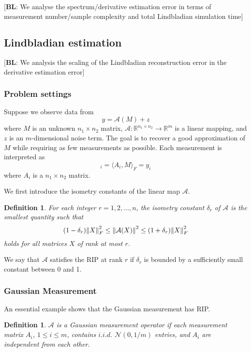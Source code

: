 \documentclass[10pt]{article}  %
\theoremstyle{plain}
\newtheorem{definition}[thm]{Definition}
\numberwithin{equation}{section}
\newcommand{\innerp}[1]{\langle{#1}\rangle}
\def\mN{\mathcal{N}}
\def\mA{\mathcal{A}}
\def\R{\mathbb{R}}
\newcommand{\bl}[1]{{\color{magenta} [\textbf{BL}: #1]}}
\renewcommand{\R}{\mathbb{R}}
\begin{document}
\bl{We analyse the spectrum/derivative estimation error in terms of measurement number/sample complexity and total Lindbladian simulation time}

\subsection{Lindbladian estimation}

\bl{We analysis the scaling of the Lindbladian reconstruction error in the derivative estimation error}

\subsubsection{Problem settings}
Suppose we observe data from 
\begin{equation}
	y = \mA(M) + z
\end{equation}
where $M$ is an unknown $n_1 \times n_2$ matrix, $\mA : \R^{n_1\times n_2} \to \R^m$ is a linear mapping, and $z$ is an $m$-dimensional noise term. The goal is to recover a good approximation of $M$ while requiring as few measurements as possible. Each measurement is interpreted as 
\begin{equation}
	[\mA(M)]_i = \innerp{A_i, M}_F = y_i
\end{equation}
where $A_i$ is a $n_1\times n_2$ matrix.





We first introduce the isometry constants of the linear map $\mA$. 
\begin{definition}
	For each integer $r = 1, 2, \dots , n$, the isometry constant $\delta_r$ of $\mA$ is the smallest quantity such that 
	\begin{equation}
		(1 - \delta_r)\norm{X}_F^2 \leq \norm{\mA(X)}^2 \leq (1 + \delta_r) \norm{X}_F^2
	\end{equation}
	holds for all matrices $X$ of rank at most $r$. 
\end{definition}
We say that $\mA$ satisfies the RIP at rank $r$ if $\delta_r$ is bounded by a sufficiently small constant between 0 and 1. 



\subsubsection{Gaussian Measurement}
An essential example shows that the Gaussian measurement has RIP.
\begin{definition}
	$\mA$ is a Gaussian measurement operator if each measurement matrix $A_i$, $1 \leq i \leq m$, contains $i.i.d.$ $\mN(0, 1/m)$ entries, and $A_i$ are independent from each other. 
\end{definition}
\end{document}
